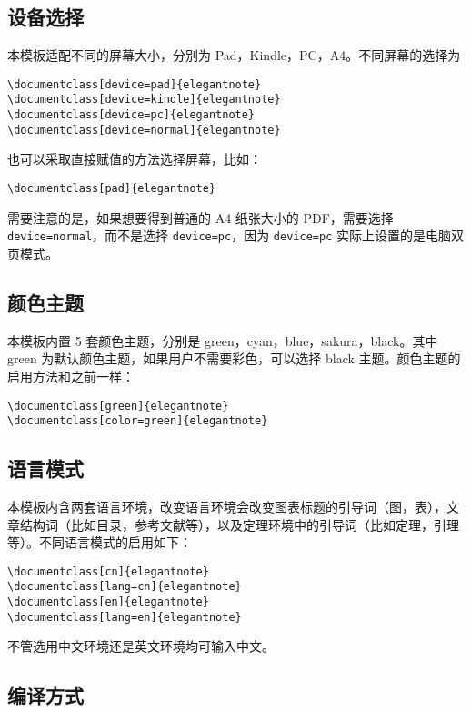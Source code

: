 \documentclass[geye,blue,normal,cn]{elegantnote}
\begin{document}
\subsection{设备选择}
本模板适配不同的屏幕大小，分别为 Pad，Kindle，PC，A4。不同屏幕的选择为
\begin{lstlisting}[frame=none]  
\documentclass[device=pad]{elegantnote}
\documentclass[device=kindle]{elegantnote}
\documentclass[device=pc]{elegantnote}
\documentclass[device=normal]{elegantnote}
\end{lstlisting}
\begin{note}
也可以采取直接赋值的方法选择屏幕，比如：
\end{note}
\begin{lstlisting}[frame=none]  
\documentclass[pad]{elegantnote}
\end{lstlisting}

需要注意的是，如果想要得到普通的 A4 纸张大小的 PDF，需要选择 \lstinline{device=normal}，而不是选择 \lstinline{device=pc}，因为  \lstinline{device=pc} 实际上设置的是电脑双页模式。

\subsection{颜色主题}
本模板内置 5 套颜色主题，分别是 green，cyan，blue，sakura，black。其中 green 为默认颜色主题，如果用户不需要彩色，可以选择 black 主题。颜色主题的启用方法和之前一样：
\begin{lstlisting}[frame=none]  
\documentclass[green]{elegantnote}
\documentclass[color=green]{elegantnote}
\end{lstlisting}

\subsection{语言模式}
本模板内含两套语言环境，改变语言环境会改变图表标题的引导词（图，表），文章结构词（比如目录，参考文献等），以及定理环境中的引导词（比如定理，引理等）。不同语言模式的启用如下：
\begin{lstlisting}[frame=none]  
\documentclass[cn]{elegantnote}
\documentclass[lang=cn]{elegantnote}
\documentclass[en]{elegantnote}
\documentclass[lang=en]{elegantnote}
\end{lstlisting}
\begin{note}
不管选用中文环境还是英文环境均可输入中文。
\end{note}

\subsection{编译方式}
\end{document}
